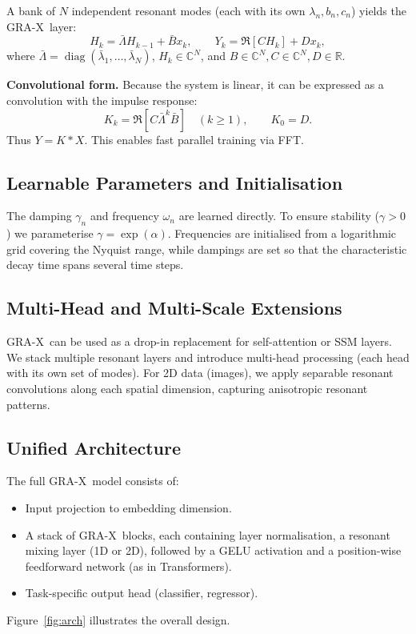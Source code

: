 \documentclass{article}
\newcommand{\R}{\mathbb{R}}
\newcommand{\C}{\mathbb{C}}
\newcommand{\GRA}{\textsc{GRA-X}}
\begin{document}
A bank of \(N\) independent resonant modes (each with its own \(\lambda_n, b_n, c_n\)) yields the \GRA\ layer:
\begin{equation}
  H_k = \bar{\Lambda} H_{k-1} + \bar{B} x_k, \qquad Y_k = \Re\left[ C H_k \right] + D x_k,
\end{equation}
where \(\bar{\Lambda} = \operatorname{diag}(\bar{\lambda}_1,\dots,\bar{\lambda}_N)\), \(H_k\in\C^N\), and \(B\in\C^N, C\in\C^N, D\in\R\).

\textbf{Convolutional form.}
Because the system is linear, it can be expressed as a convolution with the impulse response:
\begin{equation}
  K_k = \Re\left[ C \bar{\Lambda}^{k} \bar{B} \right] \quad (k\ge 1), \qquad K_0 = D.
\end{equation}
Thus \(Y = K * X\). This enables fast parallel training via FFT.

\subsection{Learnable Parameters and Initialisation}
The damping \(\gamma_n\) and frequency \(\omega_n\) are learned directly. To ensure stability (\(\gamma>0\)) we parameterise \(\gamma = \exp(\alpha)\). Frequencies are initialised from a logarithmic grid covering the Nyquist range, while dampings are set so that the characteristic decay time spans several time steps.

\subsection{Multi-Head and Multi-Scale Extensions}
\GRA\ can be used as a drop-in replacement for self-attention or SSM layers. We stack multiple resonant layers and introduce multi-head processing (each head with its own set of modes). For 2D data (images), we apply separable resonant convolutions along each spatial dimension, capturing anisotropic resonant patterns.

\subsection{Unified Architecture}
The full \GRA\ model consists of:
\begin{itemize}
  \item Input projection to embedding dimension.
  \item A stack of \GRA\ blocks, each containing layer normalisation, a resonant mixing layer (1D or 2D), followed by a GELU activation and a position-wise feedforward network (as in Transformers).
  \item Task-specific output head (classifier, regressor).
\end{itemize}
Figure~\ref{fig:arch} illustrates the overall design.
\end{document}
